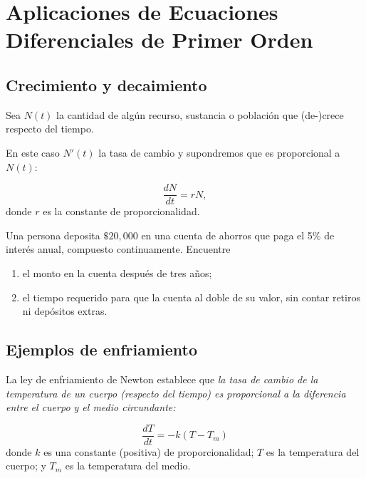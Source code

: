 



\section[Aplicaciones]{Aplicaciones de Ecuaciones Diferenciales de Primer Orden}

\subsection{Crecimiento y decaimiento}


	Sea $N(t)$ la cantidad de algún recurso, sustancia o población que (de-)crece respecto del tiempo.
	
	En este caso $N'(t)$ la tasa de cambio y supondremos que es proporcional a $N(t):$
	
	\begin{equation}
		\label{bron:7.1}
		\dfrac{dN}{dt}=rN,
	\end{equation}
	donde $r$ es la constante de proporcionalidad.



	\begin{problema}
		Una persona deposita $\$20,000$ en una cuenta de ahorros que paga el 5\% de interés  anual, compuesto continuamente.
		Encuentre
		\begin{enumerate}
			\item el monto en la cuenta después de tres años;  
			\item el tiempo requerido para que la cuenta al doble de su valor, sin contar retiros ni depósitos extras.
		\end{enumerate}
		
	\end{problema}
	


\subsection{Ejemplos de enfriamiento}


	La ley de enfriamiento de Newton establece que \emph{la tasa de cambio de la temperatura de un cuerpo (respecto del tiempo) es proporcional a la diferencia entre el cuerpo y el medio circundante:}
	
	\begin{equation}
		\label{bron:7.2}
		\dfrac{dT}{dt}=-k\left( T-T_{m} \right)
	\end{equation}
	donde $k$ es una constante (positiva) de proporcionalidad; $T$ es la temperatura del cuerpo; y $T_{m}$ es la temperatura del medio.


